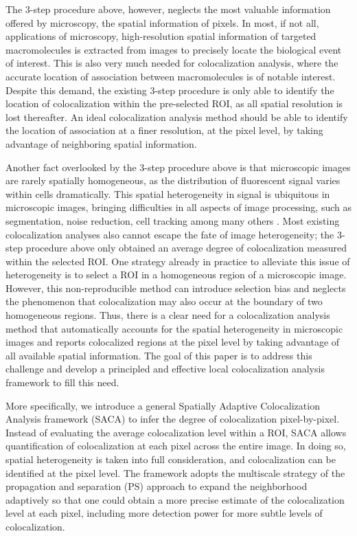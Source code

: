 \documentclass[10pt,twocolumn,twoside]{IEEEtran}
\begin{document}
The 3-step procedure above, however, neglects the most valuable information offered by microscopy, the spatial information of pixels. In most, if not all, applications of microscopy, high-resolution spatial information of targeted macromolecules is extracted from images to precisely locate the biological event of interest. This is also very much needed for colocalization analysis, where the accurate location of association between macromolecules is of notable interest. Despite this demand, the existing 3-step procedure is only able to identify the location of colocalization within the pre-selected ROI, as all spatial resolution is lost thereafter. An ideal colocalization analysis method should be able to identify the location of association at a finer resolution, at the pixel level, by taking advantage of neighboring spatial information. 

Another fact overlooked by the 3-step procedure above is that microscopic images are rarely spatially homogeneous, as the distribution of fluorescent signal varies within cells dramatically. This spatial heterogeneity in signal is ubiquitous in microscopic images, bringing difficulties in all aspects of image processing, such as segmentation, noise reduction, cell tracking among many others \citep[see][]{dunn2011,mueller2013,buggenthin2013}. Most existing colocalization analyses also cannot escape the fate of image heterogeneity; the 3-step procedure above only obtained an average degree of colocalization measured within the selected ROI. One strategy already in practice to alleviate this issue of heterogeneity is to select a ROI in a homogeneous region of a microscopic image. However, this non-reproducible method can introduce selection bias and neglects the phenomenon that colocalization may also occur at the boundary of two homogeneous regions. Thus, there is a clear need for a colocalization analysis method that automatically accounts for the spatial heterogeneity in microscopic images and reports colocalized regions at the pixel level by taking advantage of all available spatial information. The goal of this paper is to address this challenge and develop a principled and effective local colocalization analysis framework to fill this need. 

More specifically, we introduce a general Spatially Adaptive Colocalization Analysis framework (SACA) to infer the degree of colocalization pixel-by-pixel. Instead of evaluating the average colocalization level within a ROI, SACA allows quantification of colocalization at each pixel across the entire image. In doing so, spatial heterogeneity is taken into full consideration, and colocalization can be identified at the pixel level. The framework adopts the multiscale strategy of the propagation and separation (PS) approach \citep[see][]{Polzehl2000,Polzehl2006} to expand the neighborhood adaptively so that one could obtain a more precise estimate of the colocalization level at each pixel, including more detection power for more subtle levels of colocalization. 
\end{document}
